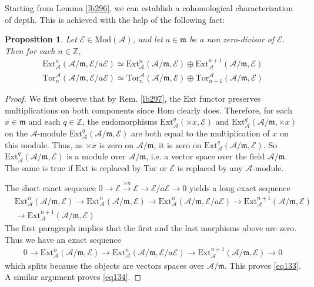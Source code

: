 \documentclass[12pt,b5paper,notitlepage]{report}
\theoremstyle{definition}
\theoremstyle{plain}
\newtheorem{pp}[df]{Proposition}
\newcommand{\mc}{\mathcal}
\newcommand{\Hom}{\mathrm{Hom}}
\newcommand{\Zbb}{\mathbb Z}
\newcommand{\Ext}{\mathrm{Ext}}
\newcommand{\Tor}{\mathrm{Tor}}
\newcommand{\Mod}{\mathrm{Mod}}
\newcommand{\mk}{\mathfrak m}
\numberwithin{equation}{section}
\begin{document}
Starting from Lemma \ref{lb296}, we can establish a cohomological characterization of depth. This is achieved with the help of the following fact:

\begin{pp}\label{lb298}
Let $\mc E\in\Mod(\mc A)$, and let $a\in\mk$ be a non zero-divisor of $\mc E$. Then for each $n\in\Zbb$,
\begin{gather}
\Ext_{\mc A}^n(\mc A/\mk,\mc E/a\mc E)\simeq \Ext_{\mc A}^n(\mc A/\mk,\mc E)\oplus\Ext_{\mc A}^{n+1}(\mc A/\mk,\mc E)  \label{eq133}\\[0.5ex]
\Tor^{\mc A}_n(\mc A/\mk,\mc E/a\mc E)\simeq \Tor^{\mc A}_n(\mc A/\mk,\mc E)\oplus \Tor^{\mc A}_{n-1}(\mc A/\mk,\mc E)\label{eq134}
\end{gather}
\end{pp}


\begin{proof}
We first observe that by Rem. \ref{lb297}, the $\Ext$ functor preserves multiplications on both components since $\Hom$ clearly does. Therefore, for each $x\in\mk$ and each $q\in\Zbb$, the endomorphisms $\Ext^q_{\mc A}(\times x,\mc E)$ and $\Ext^q_{\mc A}(\mc A/\mk,\times x)$  on the $\mc A$-module $\Ext^q_{\mc A}(\mc A/\mk,\mc E)$ are both equal to the multiplication of $x$ on this module. Thus, as $\times x$ is zero on $\mc A/\mk$, it is zero on $\Ext^q_{\mc A}(\mc A/\mk,\mc E)$. So $\Ext^q_{\mc A}(\mc A/\mk,\mc E)$ is a module over $\mc A/\mk$, i.e. a vector space over the field $\mc A/\mk$. The same is true if $\Ext$ is replaced by $\Tor$ or $\mc E$ is replaced by any $\mc A$-module.

The short exact sequence $0\rightarrow\mc E\xrightarrow{\times a}\mc E\rightarrow \mc E/a\mc E\rightarrow0$ yields a long exact sequence
\begin{align*}
&\Ext_{\mc A}^n(\mc A/\mk,\mc E)\rightarrow\Ext_{\mc A}^n(\mc A/\mk,\mc E)\rightarrow\Ext_{\mc A}^n(\mc A/\mk,\mc E/a\mc E)\rightarrow\Ext_{\mc A}^{n+1}(\mc A/\mk,\mc E)\\
&\rightarrow\Ext_{\mc A}^{n+1}(\mc A/\mk,\mc E)
\end{align*}
The first paragraph implies that the first and the last morphisms above are zero. Thus we have an exact sequence
\begin{align*}
0\rightarrow \Ext_{\mc A}^n(\mc A/\mk,\mc E)\rightarrow\Ext_{\mc A}^n(\mc A/\mk,\mc E/a\mc E)\rightarrow\Ext_{\mc A}^{n+1}(\mc A/\mk,\mc E)\rightarrow 0
\end{align*}
which splits because the objects are vectors spaces over $\mc A/\mk$. This proves \eqref{eq133}. A similar argument proves \eqref{eq134}.
\end{proof}
\end{document}

